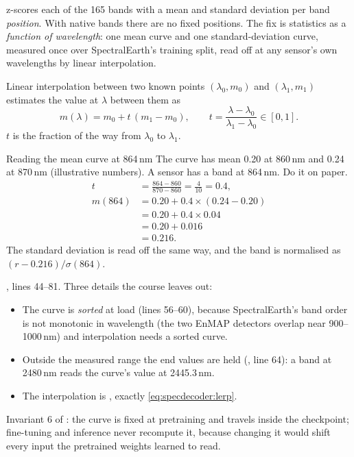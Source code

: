  z-scores each of the 165 bands with a mean and standard deviation per band \emph{position}. With native bands there are no fixed positions. The fix is statistics as a \emph{function of wavelength}: one mean curve and one standard-deviation curve, measured once over SpectralEarth's training split, read off at any sensor's own wavelengths by linear interpolation.

Linear interpolation between two known points $(\lambda_0, m_0)$ and $(\lambda_1, m_1)$ estimates the value at $\lambda$ between them as
\begin{equation}\label{eq:specdecoder:lerp}
  m(\lambda) = m_0 + t\,(m_1 - m_0),\qquad t = \frac{\lambda - \lambda_0}{\lambda_1 - \lambda_0}\in[0, 1].
\end{equation}
$t$ is the fraction of the way from $\lambda_0$ to $\lambda_1$.

\begin{worked}[label={we:specdecoder:lerp}]{Reading the mean curve at 864\,nm}
The curve has mean 0.20 at 860\,nm and 0.24 at 870\,nm (illustrative numbers\tagA). A sensor has a band at 864\,nm. Do it on paper.
\begin{align*}
  t &= \frac{864 - 860}{870 - 860} = \frac{4}{10} = 0.4,\\
  m(864) &= 0.20 + 0.4\times(0.24 - 0.20)\\
  &= 0.20 + 0.4\times0.04\\
  &= 0.20 + 0.016\\
  &= 0.216 .
\end{align*}
The standard deviation is read off the same way, and the band is normalised as $(r - 0.216)/\sigma(864)$.
\end{worked}

\begin{sourcenote}
, lines 44--81. Three details the course leaves out:
\begin{itemize}
\item The curve is \emph{sorted} at load (lines 56--60), because SpectralEarth's band order is not monotonic in wavelength (the two EnMAP detectors overlap near 900--1000\,nm) and interpolation needs a sorted curve.
\item Outside the measured range the end values are held (, line 64): a band at 2480\,nm reads the curve's value at 2445.3\,nm.
\item The interpolation is , exactly \cref{eq:specdecoder:lerp}.
\end{itemize}
Invariant 6 of : the curve is fixed at pretraining and travels inside the checkpoint; fine-tuning and inference never recompute it, because changing it would shift every input the pretrained weights learned to read.
\end{sourcenote}


